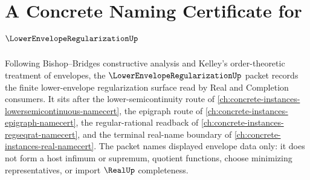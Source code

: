 \chapter{A Concrete Naming Certificate for $\LowerEnvelopeRegularizationUp$}
\label{ch:concrete-instances-lower-envelope-regularization-namecert}

Following Bishop--Bridges constructive analysis and Kelley's order-theoretic treatment of envelopes, the $\LowerEnvelopeRegularizationUp$ packet records the finite lower-envelope regularization surface read by Real and Completion consumers. It sits after the lower-semicontinuity route of \autoref{ch:concrete-instances-lowersemicontinuous-namecert}, the epigraph route of \autoref{ch:concrete-instances-epigraph-namecert}, the regular-rational readback of \autoref{ch:concrete-instances-regseqrat-namecert}, and the terminal real-name boundary of \autoref{ch:concrete-instances-real-namecert}. The packet names displayed envelope data only: it does not form a host infimum or supremum, quotient functions, choose minimizing representatives, or import $\RealUp$ completeness.

